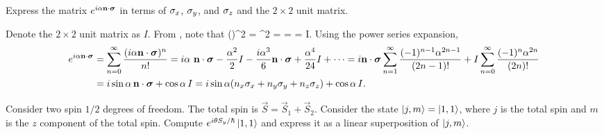 \begin{problem} \label{2.2}
	Express the matrix $e^{i \alpha \mathbf{n} \cdot \boldsymbol{\sigma}}$ in terms of $\sigma_x$, $\sigma_y$, and $\sigma_z$ and the $2 \times 2$ unit matrix.
\end{problem}

\begin{solution}
	Denote the $2 \times 2$ unit matrix as $I$.  From , note that
	\beq
		(\nds)^2 = \mqty[ \nz & \nx - i \ny \\ \nx + i \ny & -\nz ]^2
		= \mqty[ \nx^2 + \ny^2 + \nz^2 & (\nz - \nz) (\nx - i \ny) \\
				(\nz - \nz) (\nx + i \ny) & \nx^2 + \ny^2 + \nz^2]
		= \mqty[ 1 & 0 \\ 0 & 1 ]
		= I.
	\eeq
	Using the power series expansion,
	\begin{align*}
		e^{i \alpha \mathbf{n} \cdot \boldsymbol{\sigma}} &= \sum_{n = 0}^\infty \frac{(i \alpha \mathbf{n} \cdot \boldsymbol{\sigma})^n}{n!}
		= i \alpha \ \mathbf{n} \cdot \boldsymbol{\sigma} - \frac{\alpha^2}{2} I - \frac{i \alpha^3}{6} \mathbf{n} \cdot \boldsymbol{\sigma} + \frac{\alpha^4}{24} I + \cdots
		= i \mathbf{n} \cdot \boldsymbol{\sigma} \sum_{n = 1}^\infty \frac{(-1)^{n-1} \alpha^{2n - 1}}{(2n - 1)!} + I \sum_{n = 0}^\infty \frac{(-1)^n \alpha^{2n}}{(2n)!} \\
		&= i \sin{\alpha} \, \mathbf{n} \cdot \boldsymbol{\sigma} + \cos{\alpha} \, I = i \sin{\alpha} (n_x \sigma_x + n_y \sigma_y + n_z \sigma_z) + \cos{\alpha} \, I.
	\end{align*}
\vfix
\end{solution}

\newcommand{\Sy}{S_y}
\newcommand{\Sz}{S_z}
\newcommand{\vS}{\vec{S}}
\newcommand{\vSq}{\vS_1}
\newcommand{\vSw}{\vS_2}
\newcommand{\eitsyh}{e^{i \tht \Sy / \hbar}}

\newcommand{\kjm}{\ket{j, m}}
\newcommand{\kqq}{\ket{1, 1}}
\newcommand{\koo}{\ket{0, 0}}
\newcommand{\kqo}{\ket{1, 0}}
\newcommand{\kqnq}{\ket{1, -1}}

\newcommand{\Syq}{{\Sy}_1}
\newcommand{\Syw}{{\Sy}_2}
\newcommand{\sz}{s_z}
\newcommand{\ksz}{\ket{\sz}}
\newcommand{\szq}{{\sz}_1}
\newcommand{\szw}{{\sz}_2}
\newcommand{\kszsz}{\ket{\szq \, \szw}}

\newcommand{\up}{\uparrow}
\newcommand{\dn}{\downarrow}
\newcommand{\kuu}{\ket{\up \up}}
\newcommand{\kdd}{\ket{\dn \dn}}
\newcommand{\kud}{\ket{\up \dn}}
\newcommand{\kdu}{\ket{\dn \up}}

\begin{problem}
	Consider two spin $1/2$ degrees of freedom.  The total spin is $\vS = \vSq + \vSw$.  Consider the state $\kjm = \kqq$, where $j$ is the total spin and $m$ is the $z$ component of the total spin.  Compute $\eitsyh \kqq$ and express it as a linear superposition of $\kjm$.
\end{problem}

